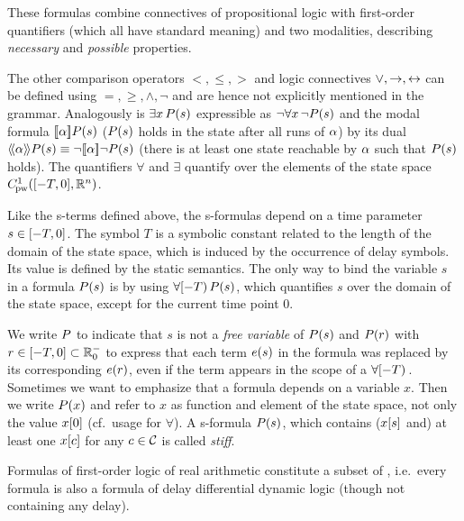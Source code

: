     These formulas combine connectives of propositional logic with first-order quantifiers (which all have standard meaning) and two modalities, describing \emph{necessary} and \emph{possible} properties.

    The other comparison operators $<,\leq,>$ and logic connectives $\lor,\rightarrow,\leftrightarrow$ can be defined using $=,\geq,\land,\lnot$ and are hence not explicitly mentioned in the grammar.
    Analogously is $\exists x{\,} P(s)$ expressible as $\lnot\forall x{\,} \lnot P(s)$ and the modal formula $\dbox{\asprg}{\asfml(s)}$ ($P(s)$ holds in the state after all runs of $\alpha$) by its dual $\ddiamond{\asprg}{\asfml(s)}\equiv\lnot\dbox{\asprg}{\lnot\asfml(s)}$ (there is at least one state reachable by $\alpha$ such that $P(s)$ holds).
    The quantifiers $\forall$ and $\exists$ quantify over the elements of the state space $\statespace$.

    Like the s-terms defined above, the s-formulas depend on a time parameter $s\in[-T,0]$. The symbol $T$ is a symbolic constant related to the length of the domain of the state space, which is induced by the occurrence of delay symbols. Its value is defined by the static semantics.
    The only way to bind the variable $s$ in a formula $P(s)$ is by using $\forall [-T){\,} P(s)$, which quantifies $s$ over the domain of the state space, except for the current time point $0$.

    We write $P$ to indicate that $s$ is not a \emph{free variable} of $P(s)$ and $P(r)$ with $r\in[-T,0]\subset\mathbb{R}^-_0$ to express that each term $e(s)$ in the formula was replaced by its corresponding $e(r)$, even if the term appears in the scope of a $\forall [-T){\,}$.
    Sometimes we want to emphasize that a formula depends on a variable $x$. Then we write $P(x)$ and refer to $x$ as function and element of the state space, not only the value $x[0]$ (cf.\ usage for $\forall$).
    A s-formula $P(s)$, which contains ($x[s]$ and) at least one $x[c]$ for any $c\in\mathcal{C}_{}$ is called \emph{stiff}.

    Formulas of first-order logic of real arithmetic constitute a subset of \ddL, i.e.\ every \FOLR formula is also a formula of delay differential dynamic logic (though not containing any delay).

